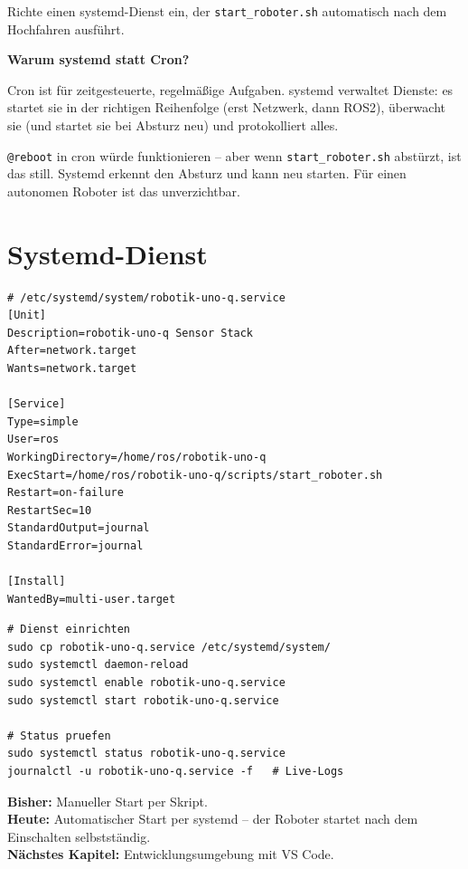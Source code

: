 \begin{aufgabeBox}
Richte einen systemd-Dienst ein, der \texttt{start\_roboter.sh}
automatisch nach dem Hochfahren ausführt.
\end{aufgabeBox}

\begin{haubeBox}
\textbf{Warum systemd statt Cron?}

Cron ist für zeitgesteuerte, regelmäßige Aufgaben.
systemd verwaltet Dienste: es startet sie in der richtigen
Reihenfolge (erst Netzwerk, dann ROS2), überwacht sie
(und startet sie bei Absturz neu) und protokolliert alles.

\texttt{@reboot} in cron würde funktionieren -- aber wenn
\texttt{start\_roboter.sh} abstürzt, ist das still.
Systemd erkennt den Absturz und kann neu starten.
Für einen autonomen Roboter ist das unverzichtbar.
\end{haubeBox}

\section{Systemd-Dienst}

\begin{lstlisting}[style=text]
# /etc/systemd/system/robotik-uno-q.service
[Unit]
Description=robotik-uno-q Sensor Stack
After=network.target
Wants=network.target

[Service]
Type=simple
User=ros
WorkingDirectory=/home/ros/robotik-uno-q
ExecStart=/home/ros/robotik-uno-q/scripts/start_roboter.sh
Restart=on-failure
RestartSec=10
StandardOutput=journal
StandardError=journal

[Install]
WantedBy=multi-user.target
\end{lstlisting}

\begin{lstlisting}[style=bash]
# Dienst einrichten
sudo cp robotik-uno-q.service /etc/systemd/system/
sudo systemctl daemon-reload
sudo systemctl enable robotik-uno-q.service
sudo systemctl start robotik-uno-q.service

# Status pruefen
sudo systemctl status robotik-uno-q.service
journalctl -u robotik-uno-q.service -f   # Live-Logs
\end{lstlisting}

\begin{projektBox}
\textbf{Bisher:} Manueller Start per Skript.\\
\textbf{Heute:} Automatischer Start per systemd -- der Roboter
startet nach dem Einschalten selbstständig.\\
\textbf{Nächstes Kapitel:} Entwicklungsumgebung mit VS Code.
\end{projektBox}


